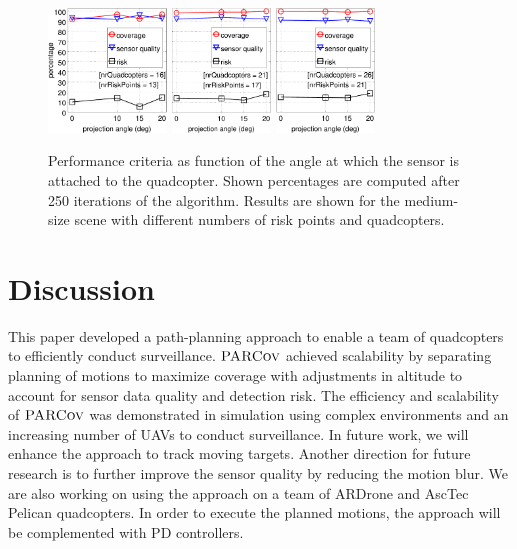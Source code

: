 \documentclass[letterpaper, 10pt, conference]{ieeeconf}
\newcommand{\Function}[1]{\ensuremath{{ \textsc{#1}}}}
\newcommand{\Name}{\Function{\small{PARCov}}}
\begin{document}
\begin{figure}
\centering
\includegraphics[height=1.3in]{usef/figResCameraR13Q16}
\includegraphics[height=1.3in]{usef/noy/figResCameraR17Q21}
\includegraphics[height=1.3in]{usef/noy/figResCameraR21Q26}
\caption{Performance criteria as function of the angle at which the
  sensor is attached to the quadcopter. Shown percentages
are computed after 250 iterations of the algorithm. Results are
shown for the medium-size scene with different numbers of risk points and
quadcopters.} \label{fig:ResCamera}
\end{figure}



\section{Discussion}

This paper developed a path-planning approach to enable a team of
quadcopters to efficiently conduct surveillance. $\Name$
achieved scalability by separating planning of motions to maximize
coverage with adjustments in altitude to account for sensor data quality
and detection risk.  The efficiency and scalability of $\Name$ was
demonstrated in simulation using complex environments and an
increasing number of UAVs to conduct surveillance.  In future
work, we will enhance the approach to track moving targets. Another
direction for future research is to further improve the sensor quality
by reducing the motion blur. We are also working on using the approach
on a team of ARDrone and AscTec Pelican quadcopters. In order to
execute the planned motions, the approach will be complemented with PD
controllers.
\end{document}
